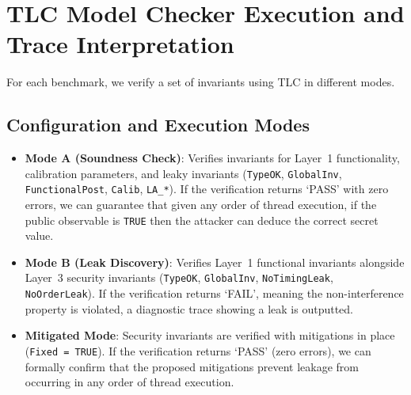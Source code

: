 \documentclass[a4paper,12pt]{report}
\begin{document}
\section{TLC Model Checker Execution and Trace Interpretation}
For each benchmark, we verify a set of invariants using TLC in different modes.

\subsection{Configuration and Execution Modes}
\begin{itemize}[itemsep=0.2em, topsep=0.15em]
    \item \textbf{Mode A (Soundness Check)}: Verifies invariants for Layer~1 functionality, calibration parameters, and leaky invariants (\texttt{TypeOK}, \texttt{GlobalInv}, \texttt{FunctionalPost}, \texttt{Calib}, \texttt{LA\_*}). If the verification returns `PASS' with zero errors, we can guarantee that given any order of thread execution, if the public observable is \texttt{TRUE} then the attacker can deduce the correct secret value.
    \item \textbf{Mode B (Leak Discovery)}: Verifies Layer~1 functional invariants alongside Layer~3 security invariants (\texttt{TypeOK}, \texttt{GlobalInv}, \texttt{NoTimingLeak}, \texttt{NoOrderLeak}). If the verification returns `FAIL', meaning the non-interference property is violated, a diagnostic trace showing a leak is outputted.
    \item \textbf{Mitigated Mode}: Security invariants are verified with mitigations in place (\texttt{Fixed = TRUE}). If the verification returns `PASS' (zero errors), we can formally confirm that the proposed mitigations prevent leakage from occurring in any order of thread execution.
\end{itemize}
\end{document}
